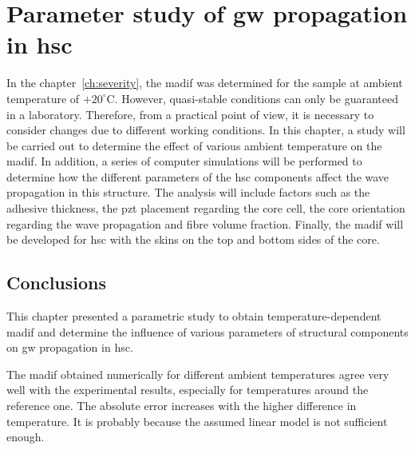 
\chapter[Parameter study of \ac{gw} propagation in \ac{hsc}]{Parameter study of \ac{gw} propagation in \ac{hsc}}
\label{ch:tempEffects}

In the chapter~\ref{ch:severity}, the \ac{madif} was determined for the sample at ambient temperature of \(+20^{\circ}\)C.
However, quasi-stable conditions can only be guaranteed in a laboratory.
Therefore, from a practical point of view, it is necessary to consider changes due to different working conditions.
In this chapter, a study will be carried out to determine the effect of various ambient temperature on the \ac{madif}.
In addition, a series of computer simulations will be performed to determine how the different parameters of the \ac{hsc} components affect the wave propagation in this structure.
The analysis will include factors such as the adhesive thickness, the \ac{pzt} placement regarding the core cell, the core orientation regarding the wave propagation and fibre volume fraction.
Finally, the \ac{madif} will be developed for \ac{hsc} with the skins on the top and bottom sides of the core.


\section{Conclusions}
\label{sec:conclusionsTemp}
This chapter presented a parametric study to obtain temperature-dependent \ac{madif} and determine the influence of various parameters of structural components on \ac{gw} propagation in \ac{hsc}.

The \ac{madif} obtained numerically for different ambient temperatures agree very well with the experimental results, especially for temperatures around the reference one.
The absolute error increases with the higher difference in temperature.
It is probably because the assumed linear model is not sufficient enough.


